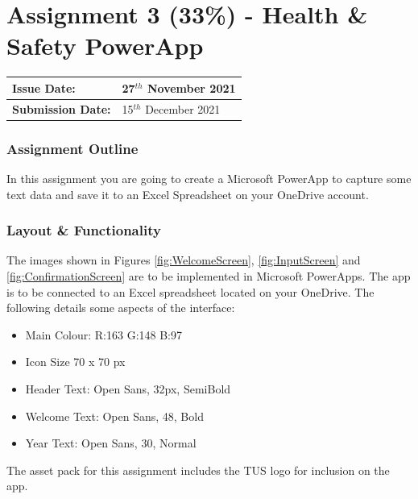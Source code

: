 
	
\part*{Assignment 3 (33\%) - Health \& Safety PowerApp}

\begin{tabularx}{\textwidth}{ |X|X| }
	\hline
	\textbf{Issue Date:} & 27$^{th}$ November 2021 \\
	\hline 
	\textbf{Submission Date:}  & 15$^{th}$ December 2021  \\
	\hline
\end{tabularx}


\section*{Assignment Outline}

In this assignment you are going to create a Microsoft PowerApp to capture some text data and save it to an Excel Spreadsheet on your OneDrive account.  


\section*{Layout \& Functionality}

The images shown in Figures \ref*{fig:WelcomeScreen}, \ref{fig:InputScreen} and \ref{fig:ConfirmationScreen} are to be implemented in Microsoft PowerApps.  The app is to be connected to an Excel spreadsheet located on your OneDrive. The following details some aspects of the interface: 

\begin{itemize}
	\item Main Colour: R:163 G:148 B:97
	\item Icon Size 70 x 70 px
	\item Header Text: Open Sans, 32px, SemiBold
	\item Welcome Text: Open Sans, 48, Bold
	\item Year Text: Open Sans, 30, Normal
\end{itemize}


The asset pack for this assignment includes the TUS logo for inclusion on the app.



